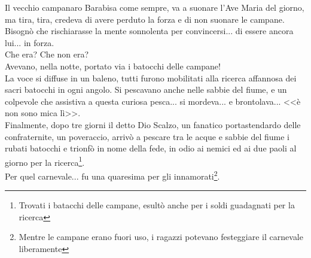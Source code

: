 Il vecchio campanaro Barabisa come sempre, va a suonare l'Ave Maria del giorno, ma tira, tira, credeva di avere perduto la forza e di non suonare le campane. Bisognò che rischiarasse la mente sonnolenta per convincersi... di essere ancora lui... in forza.\\
\indent Che era? Che non era?\\
\indent Avevano, nella notte, portato via i batocchi delle campane!\\
\indent La voce si diffuse in un baleno, tutti furono mobilitati alla ricerca affannosa dei sacri batocchi in ogni angolo. Si pescavano anche nelle sabbie del fiume, e un colpevole che assistiva a questa curiosa pesca... si mordeva... e brontolava... <<è non sono mica lì>>.\\
\indent Finalmente, dopo tre giorni il detto Dio Scalzo, un fanatico portastendardo delle confraternite, un poveraccio, arrivò a pescare tra le acque e sabbie del fiume i rubati batocchi e trionfò in nome della fede, in odio ai nemici ed ai due paoli al giorno per la ricerca\footnote{Trovati i batacchi delle campane, esultò anche per i soldi guadagnati per la ricerca}.\\
\indent Per quel carnevale... fu una quaresima per gli innamorati\footnote{Mentre le campane erano fuori uso, i ragazzi potevano festeggiare il carnevale liberamente}.
























%